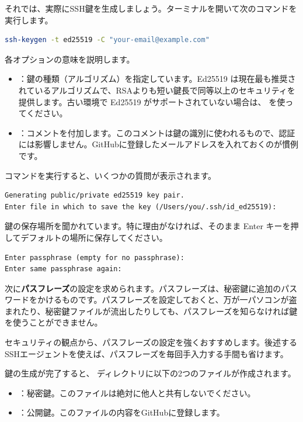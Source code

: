 それでは、実際にSSH鍵を生成しましょう。ターミナルを開いて次のコマンドを実行します。

\begin{lstlisting}[language=bash]
ssh-keygen -t ed25519 -C "your-email@example.com"
\end{lstlisting}

各オプションの意味を説明します。

\begin{itemize}
  \item {}：鍵の種類（アルゴリズム）を指定しています。Ed25519 は現在最も推奨されているアルゴリズムで、RSAよりも短い鍵長で同等以上のセキュリティを提供します。古い環境で Ed25519 がサポートされていない場合は、 を使ってください。
  \item {}：コメントを付加します。このコメントは鍵の識別に使われるもので、認証には影響しません。GitHubに登録したメールアドレスを入れておくのが慣例です。
\end{itemize}

コマンドを実行すると、いくつかの質問が表示されます。

\begin{lstlisting}[language={}]
Generating public/private ed25519 key pair.
Enter file in which to save the key (/Users/you/.ssh/id_ed25519):
\end{lstlisting}

鍵の保存場所を聞かれています。特に理由がなければ、そのまま Enter キーを押してデフォルトの場所に保存してください。

\begin{lstlisting}[language={}]
Enter passphrase (empty for no passphrase):
Enter same passphrase again:
\end{lstlisting}

次に\textbf{パスフレーズ}の設定を求められます。パスフレーズは、秘密鍵に追加のパスワードをかけるものです。パスフレーズを設定しておくと、万が一パソコンが盗まれたり、秘密鍵ファイルが流出したりしても、パスフレーズを知らなければ鍵を使うことができません。

セキュリティの観点から、パスフレーズの設定を強くおすすめします。後述するSSHエージェントを使えば、パスフレーズを毎回手入力する手間も省けます。

鍵の生成が完了すると、 ディレクトリに以下の2つのファイルが作成されます。

\begin{itemize}
  \item {}：秘密鍵。このファイルは絶対に他人と共有しないでください。
  \item {}：公開鍵。このファイルの内容をGitHubに登録します。
\end{itemize}


